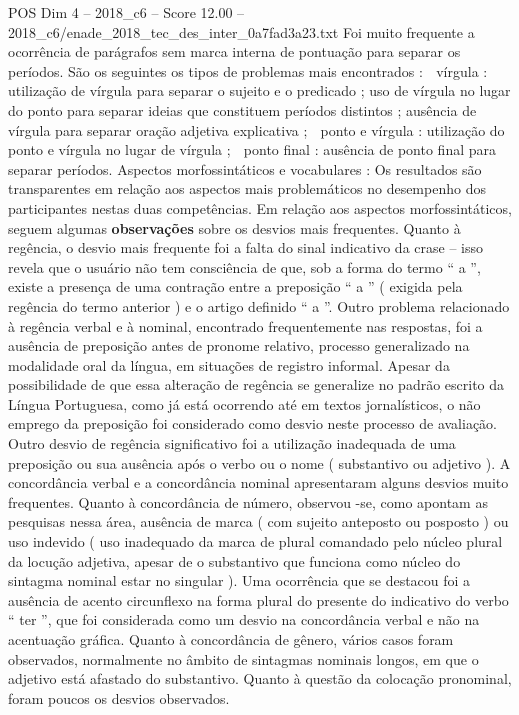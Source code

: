 \begin{textsample}{POS Dim 4 – 2018\_c6 – Score 12.00 – 2018\_c6/enade\_2018\_tec\_des\_inter\_0a7fad3a23.txt}
Foi muito frequente a ocorrência de parágrafos sem marca interna de pontuação para separar os períodos.
São os seguintes os tipos de problemas mais encontrados :  vírgula : utilização de vírgula para separar o sujeito e o predicado ; uso de vírgula no lugar do ponto para separar ideias que constituem períodos distintos ; ausência de vírgula para separar oração adjetiva explicativa ;  ponto e vírgula : utilização do ponto e vírgula no lugar de vírgula ;  ponto final : ausência de ponto final para separar períodos.
Aspectos morfossintáticos e vocabulares : Os resultados são transparentes em relação aos aspectos mais problemáticos no desempenho dos participantes nestas duas competências.
Em relação aos aspectos morfossintáticos, seguem algumas \textbf{observações} sobre os desvios mais frequentes.
Quanto à regência, o desvio mais frequente foi a falta do sinal indicativo da crase – isso revela que o usuário não tem consciência de que, sob a forma do termo “ a ”, existe a presença de uma contração entre a preposição “ a ” ( exigida pela regência do termo anterior ) e o artigo definido “ a ”.
Outro problema relacionado à regência verbal e à nominal, encontrado frequentemente nas respostas, foi a ausência de preposição antes de pronome relativo, processo generalizado na modalidade oral da língua, em situações de registro informal.
Apesar da possibilidade de que essa alteração de regência se generalize no padrão escrito da Língua Portuguesa, como já está ocorrendo até em textos jornalísticos, o não emprego da preposição foi considerado como desvio neste processo de avaliação.
Outro desvio de regência significativo foi a utilização inadequada de uma preposição ou sua ausência após o verbo ou o nome ( substantivo ou adjetivo ).
A concordância verbal e a concordância nominal apresentaram alguns desvios muito frequentes.
Quanto à concordância de número, observou -se, como apontam as pesquisas nessa área, ausência de marca ( com sujeito anteposto ou posposto ) ou uso indevido ( uso inadequado da marca de plural comandado pelo núcleo plural da locução adjetiva, apesar de o substantivo que funciona como núcleo do sintagma nominal estar no singular ).
Uma ocorrência que se destacou foi a ausência de acento circunflexo na forma plural do presente do indicativo do verbo “ ter ”, que foi considerada como um desvio na concordância verbal e não na acentuação gráfica.
Quanto à concordância de gênero, vários casos foram observados, normalmente no âmbito de sintagmas nominais longos, em que o adjetivo está afastado do substantivo.
Quanto à questão da colocação pronominal, foram poucos os desvios observados.

\end{textsample}
